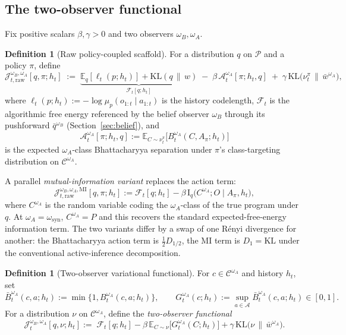 \documentclass[11pt]{article}
\theoremstyle{definition}
\newtheorem{definition}[theorem]{Definition}
\theoremstyle{remark}
\newcommand{\Acal}{\mathcal{A}}
\newcommand{\Ccal}{\mathcal{C}}
\newcommand{\Pcal}{\mathcal{P}}
\newcommand{\E}{\mathbb{E}}
\newcommand{\KL}{\mathrm{KL}}
\newcommand{\I}{\mathrm{I}}
\newcommand{\givena}{\,\|\,}
\newcommand{\ellp}{\ell}
\begin{document}
\subsection{The two-observer functional}
\label{sec:two-observer-functional}

Fix positive scalars $\beta,\gamma>0$ and two observers $\omega_B,\omega_A$.

\begin{definition}[Raw policy-coupled scaffold]
\label{def:raw-two-observer-functional}
For a distribution $q$ on $\Pcal$ and a policy $\pi$, define
\[
\mathcal J_{t,\mathrm{raw}}^{\omega_B,\omega_A}[q,\pi;h_t]
\;:=\;
\underbrace{\E_q[\ellp_t(p;h_t)]+\KL(q\givena w)}_{\mathcal F_t[q;h_t]}
\;-\;\beta\,\mathcal A_t^{\omega_A}[\pi;h_t,q]
\;+\;\gamma\,\KL\!\bigl(\nu_t^\pi\,\|\,\bar w^{\omega_A}\bigr),
\]
where $\ellp_t(p;h_t):=-\log\mu_p(o_{1:t}\mid a_{1:t})$ is the history codelength, $\mathcal F_t$ is the algorithmic free energy referenced by the belief observer $\omega_B$ through its pushforward $\bar q^{\omega_B}$ (Section~\ref{sec:belief}), and
\[
\mathcal A_t^{\omega_A}[\pi;h_t,q]:=\E_{C\sim\nu_t^\pi}\bigl[B_t^{\omega_A}(C,A_\pi;h_t)\bigr]
\]
is the expected $\omega_A$-class Bhattacharyya separation under $\pi$'s class-targeting distribution on $\Ccal^{\omega_A}$.
\end{definition}

A parallel \emph{mutual-information variant} replaces the action term:
\[
\mathcal J_{t,\mathrm{raw}}^{\omega_B,\omega_A,\mathrm{MI}}[q,\pi;h_t]
:=\mathcal F_t[q;h_t]-\beta\,\I_q\!\bigl(C^{\omega_A};O\mid A_\pi,h_t\bigr),
\]
where $C^{\omega_A}$ is the random variable coding the $\omega_A$-class of the true program under $q$. At $\omega_A=\omega_{\mathrm{syn}}$, $C^{\omega_A}=P$ and this recovers the standard expected-free-energy information term. The two variants differ by a swap of one R\'enyi divergence for another: the Bhattacharyya action term is $\tfrac{1}{2}D_{1/2}$, the MI term is $D_1=\KL$ under the conventional active-inference decomposition.

\begin{definition}[Two-observer variational functional]
\label{def:two-observer-functional}
For $c\in\Ccal^{\omega_A}$ and history $h_t$, set
\[
\bar B_t^{\omega_A}(c,a;h_t):=\min\!\bigl\{1,B_t^{\omega_A}(c,a;h_t)\bigr\},
\qquad
G_t^{\omega_A}(c;h_t):=\sup_{a\in\Acal}\bar B_t^{\omega_A}(c,a;h_t)\in[0,1].
\]
For a distribution $\nu$ on $\Ccal^{\omega_A}$, define the \emph{two-observer functional}
\[
\boxed{\;
\mathcal J_t^{\omega_B,\omega_A}[q,\nu;h_t]
:=\;
\mathcal F_t[q;h_t]
-\beta\,\E_{C\sim\nu}\!\bigl[G_t^{\omega_A}(C;h_t)\bigr]
+\gamma\,\KL\!\bigl(\nu\,\|\,\bar w^{\omega_A}\bigr).
\;}
\]
\end{definition}
\end{document}
